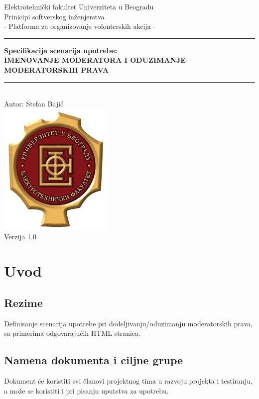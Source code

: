 \documentclass[11pt,a4paper]{article}
\begin{document}
\begin{titlepage}

\centering
\textnormal{\large Elektrotehnički fakultet Univerziteta u Beogradu}\\[0.1cm]
\textnormal{\large Prinicipi softverskog inženjerstva}\\[3cm]

\textnormal{\normalsize - Platforma za organizovanje volonterskih akcija -}\\\vspace{-5mm}
\rule{\textwidth}{0.4pt}
{\huge \bfseries Specifikacija scenarija upotrebe:\\ 
IMENOVANJE MODERATORA I ODUZIMANJE MODERATORSKIH PRAVA\par}\vspace{-1mm}
\rule{\textwidth}{0.4pt}\\\vspace{1mm}
\textnormal{\large Autor: Stefan Bajić}\\[6cm]

\includegraphics[scale=0.5]{logo.jpg}\\
\vfill
\textnormal{\normalsize Verzija 1.0}\\

\end{titlepage}

\tableofcontents

\newpage

\section{Uvod}
\subsection{Rezime}
Definisanje scenarija upotrebe pri dodeljivanju/oduzimanju moderatorskih prava, sa primerima odgovarajućih HTML stranica.
\subsection{Namena dokumenta i ciljne grupe}
Dokument će koristiti svi članovi projektnog tima u razvoju projekta i testiranju, a može se koristiti i pri pisanju uputstva za upotrebu.
\end{document}
